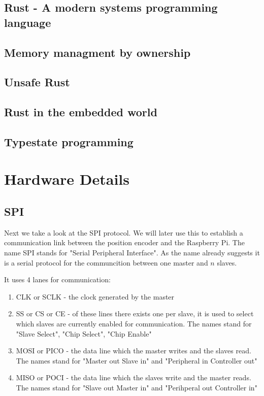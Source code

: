 \subsection{Rust - A modern systems programming language}
\label{sec:background:rust:}

\subsection{Memory managment by ownership}
\label{sec:background:rust:ownership}

\subsection{Unsafe Rust}
\label{sec:background:rust:unsafe}

\subsection{Rust in the embedded world}
\label{sec:background:rust:embedded}

\subsection{Typestate programming}
\label{sec:background:rust:typestate}

\section{Hardware Details}
\label{sec:background:hardware}

\subsection{SPI}
\label{sec:background:hardware:spi}

Next we take a look at the SPI protocol.
We will later use this to establish a communication link between the position encoder and the Raspberry Pi.
The name SPI stands for "Serial Peripheral Interface".
As the name already suggests it is a serial protocol for the communcition between one master and $n$ slaves.

It uses 4 lanes for communication\cite[p. 220]{SensornetzwerkeInTheorieUndPraxis}:

\begin{enumerate}
    \item CLK or SCLK - the clock generated by the master
    \item SS or CS or CE - of these lines there exists one per slave, it is used to select which slaves are currently enabled for communication. The names stand for "Slave Select", "Chip Select", "Chip Enable"
    \item MOSI or PICO - the data line which the master writes and the slaves read. The names stand for "Master out Slave in" and "Peripheral in Controller out"
    \item MISO or POCI - the data line which the slaves write and the master reads. The names stand for "Slave out Master in" and "Perihperal out Controller in"
\end{enumerate}

